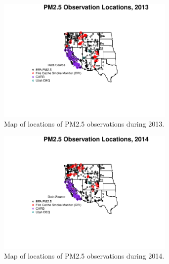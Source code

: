 \begin{figure} 
\centering 
\includegraphics[width=0.77\textwidth]{Code_Outputs/MonitorLocationsByYear/MapPM25_All_Sitesplot_year2013.pdf} 
\caption{\label{fig:MapPM25Loc2013}Map of locations of PM2.5 observations during 2013.} 
\end{figure} 
 

\begin{figure} 
\centering 
\includegraphics[width=0.77\textwidth]{Code_Outputs/MonitorLocationsByYear/MapPM25_All_Sitesplot_year2014.pdf} 
\caption{\label{fig:MapPM25Loc2014}Map of locations of PM2.5 observations during 2014.} 
\end{figure} 
 
